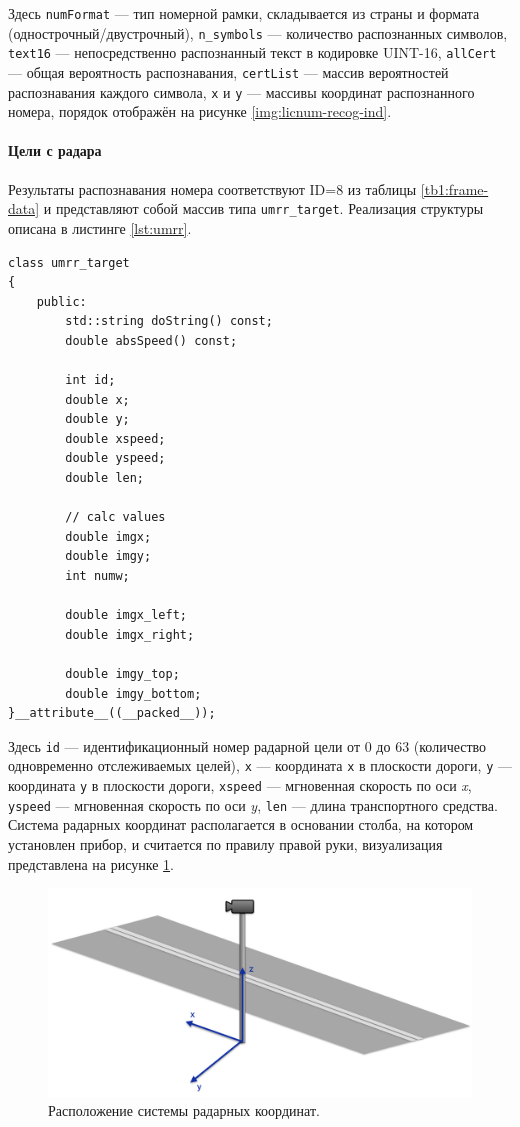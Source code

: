 \documentclass[specification,annotation,times]{itmo-student-thesis}
\begin{document}
Здесь \texttt{numFormat} --- тип номерной рамки, складывается из страны  и формата (однострочный/двустрочный), \texttt{n\_symbols} --- количество распознанных символов,  \texttt{text16} --- непосредственно распознанный текст в кодировке UINT-16,  \texttt{allCert} --- общая вероятность распознавания,  \texttt{certList} --- массив вероятностей распознавания каждого символа,  \texttt{x} и \texttt{y} --- массивы координат распознанного номера, порядок отображён на рисунке \ref{img:licnum-recog-ind}.


\paragraph{Цели с радара}
Результаты распознавания номера соответствуют ID=8 из таблицы \ref{tb1:frame-data} и представляют собой массив типа \texttt{umrr\_target}. Реализация структуры описана в листинге \ref{lst:umrr}.

\begin{lstlisting}[float=!h,caption={Реализация структуры \texttt{umrr\_target}.},label={lst:umrr}]
class umrr_target
{
	public:
		std::string doString() const;
		double absSpeed() const;

		int id;
		double x;
		double y;
		double xspeed;
		double yspeed;
		double len;

		// calc values
		double imgx;
		double imgy;
		int numw;

		double imgx_left;
		double imgx_right;

		double imgy_top;
		double imgy_bottom;
}__attribute__((__packed__));
\end{lstlisting}

Здесь \texttt{id} --- идентификационный номер радарной цели от 0 до 63 (количество одновременно отслеживаемых целей), \texttt{x} --- координата \texttt{x} в плоскости дороги, \texttt{y} --- координата \texttt{y} в плоскости дороги,  \texttt{xspeed} --- мгновенная скорость по оси \textit{x},  \texttt{yspeed} --- мгновенная скорость по оси \textit{y},  \texttt{len}  --- длина транспортного средства. Система радарных координат располагается в основании столба, на котором установлен прибор, и считается по правилу правой руки, визуализация представлена на рисунке \ref{img:road-coords}.

\begin{figure}[!ht]
	\caption{Расположение системы радарных координат.}\label{img:road-coords}
	\includegraphics[width=0.85\linewidth]{../png/road_coords.png}
	\centering
\end{figure}
\end{document}

